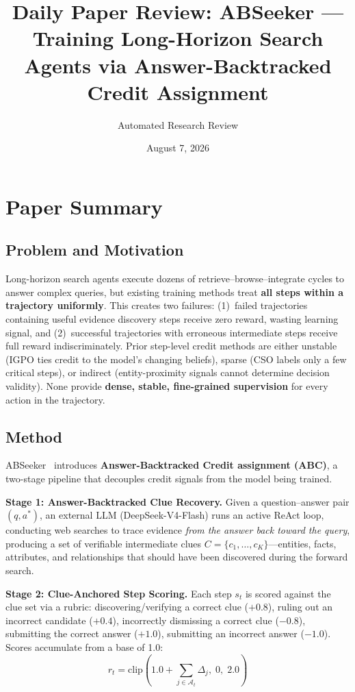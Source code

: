 \documentclass[11pt,a4paper]{article}
\title{Daily Paper Review: ABSeeker --- Training Long-Horizon Search Agents via Answer-Backtracked Credit Assignment}
\author{Automated Research Review}
\date{August 7, 2026}
\begin{document}
\maketitle

\section{Paper Summary}

\subsection{Problem and Motivation}
Long-horizon search agents execute dozens of retrieve--browse--integrate cycles to answer complex queries, but existing training methods treat \textbf{all steps within a trajectory uniformly}. This creates two failures: (1)~failed trajectories containing useful evidence discovery steps receive zero reward, wasting learning signal, and (2)~successful trajectories with erroneous intermediate steps receive full reward indiscriminately. Prior step-level credit methods are either unstable (IGPO ties credit to the model's changing beliefs), sparse (CSO labels only a few critical steps), or indirect (entity-proximity signals cannot determine decision validity). None provide \textbf{dense, stable, fine-grained supervision} for every action in the trajectory.

\subsection{Method}
ABSeeker~\cite{lu2026abseeker} introduces \textbf{Answer-Backtracked Credit assignment (ABC)}, a two-stage pipeline that decouples credit signals from the model being trained.

\textbf{Stage 1: Answer-Backtracked Clue Recovery.} Given a question--answer pair $(q, a^*)$, an external LLM (DeepSeek-V4-Flash) runs an active ReAct loop, conducting web searches to trace evidence \emph{from the answer back toward the query}, producing a set of verifiable intermediate clues $C = \{c_1, \ldots, c_K\}$---entities, facts, attributes, and relationships that should have been discovered during the forward search.

\textbf{Stage 2: Clue-Anchored Step Scoring.} Each step $s_t$ is scored against the clue set via a rubric: discovering/verifying a correct clue ($+0.8$), ruling out an incorrect candidate ($+0.4$), incorrectly dismissing a correct clue ($-0.8$), submitting the correct answer ($+1.0$), submitting an incorrect answer ($-1.0$). Scores accumulate from a base of 1.0:
\begin{equation}
    r_t = \mathrm{clip}\!\left(1.0 + \sum_{j \in \mathcal{A}_t} \Delta_j,\; 0,\; 2.0\right)
\end{equation}
\end{document}
